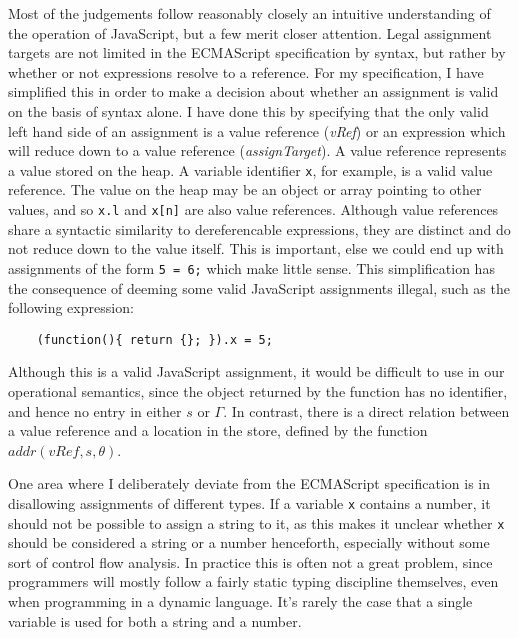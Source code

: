 \documentclass[12pt,a4paper,twoside,openright]{report}
\newcommand*{\js}{\texttt}
\begin{document}
Most of the judgements follow reasonably closely an intuitive understanding of
the operation of JavaScript, but a few merit closer attention. Legal assignment
targets are not limited in the ECMAScript specification by syntax, but rather
by whether or not expressions resolve to a reference. For my specification, I
have simplified this in order to make a decision about whether an assignment is
valid on the basis of syntax alone. I have done this by specifying that the
only valid left hand side of an assignment is a value reference (\textit{vRef})
or an expression which will reduce down to a value reference
(\textit{assignTarget}). A value reference represents a value stored on the
heap. A variable identifier \js{x}, for example, is a valid value
reference. The value on the heap may be an object or array pointing to other
values, and so \js{x.l} and \js{x[n]} are also value references. Although
value references share a syntactic similarity to dereferencable expressions,
they are distinct and do not reduce down to the value itself. This is
important, else we could end up with assignments of the form \js{5 = 6;}
which make little sense. This simplification has the consequence of deeming
some valid JavaScript assignments illegal, such as the following expression:
\begin{program}[H]
  \begin{verbatim}
	(function(){ return {}; }).x = 5;
  \end{verbatim}
\end{program}
Although this is a valid JavaScript assignment, it would be difficult to use in
our operational semantics, since the object returned by the function has no
identifier, and hence no entry in either $s$ or $\Gamma$. In contrast, there is
a direct relation between a value reference and a location in the store,
defined by the function $addr(vRef, s, \theta)$.

One area where I deliberately deviate from the ECMAScript specification is in
disallowing assignments of different types. If a variable \js{x} contains a
number, it should not be possible to assign a string to it, as this makes it
unclear whether \js{x} should be considered a string or a number
henceforth, especially without some sort of control flow analysis. In practice
this is often not a great problem, since programmers will mostly follow a
fairly static typing discipline themselves, even when programming in a dynamic
language. It's rarely the case that a single variable is used for both a string
and a number.
\end{document}
